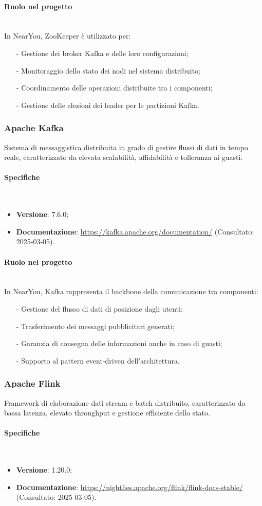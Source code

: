 \documentclass[10pt]{article}
\newcommand{\myparagraph}[1]{\paragraph{#1}\mbox{}\\}
\begin{document}
\myparagraph{Ruolo nel progetto}
In NearYou, ZooKeeper è utilizzato per:
\begin{itemize}
    \item[-] Gestione dei broker Kafka e delle loro configurazioni;
    \item[-] Monitoraggio dello stato dei nodi nel sistema distribuito;
    \item[-] Coordinamento delle operazioni distribuite tra i componenti;
    \item[-] Gestione delle elezioni dei leader per le partizioni Kafka.
\end{itemize}

\subsubsection{Apache Kafka}\label{subsec:Kafka}
Sistema di messaggistica distribuita in grado di gestire flussi di dati in tempo reale, caratterizzato da elevata scalabilità, affidabilità e tolleranza ai guasti.

\myparagraph{Specifiche}
\begin{itemize}
    \item \textbf{Versione}: 7.6.0;
    \item \textbf{Documentazione}: \textcolor{blue}{\url{https://kafka.apache.org/documentation/}} (Consultato: 2025-03-05).
\end{itemize}

\myparagraph{Ruolo nel progetto}
In NearYou, Kafka rappresenta il backbone della comunicazione tra componenti:
\begin{itemize}
    \item[-] Gestione del flusso di dati di posizione dagli utenti;
    \item[-] Trasferimento dei messaggi pubblicitari generati;
    \item[-] Garanzia di consegna delle informazioni anche in caso di guasti;
    \item[-] Supporto al pattern event-driven dell'architettura.
\end{itemize}

\subsubsection{Apache Flink}\label{subsec:Flink}
Framework di elaborazione dati stream e batch distribuito, caratterizzato da bassa latenza, elevato throughput e gestione efficiente dello stato.

\myparagraph{Specifiche}
\begin{itemize}
    \item \textbf{Versione}: 1.20.0;
    \item \textbf{Documentazione}: \textcolor{blue}{\url{https://nightlies.apache.org/flink/flink-docs-stable/}} (Consultato: 2025-03-05).
\end{itemize}
\end{document}
